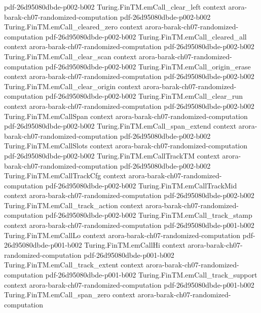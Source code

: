 \begin{theorem}
  {pdf-26d95080dbde-p002-b002}
\proofstep
  {Turing.FinTM.emCall_clear_left}
  {context}
  {arora-barak-ch07-randomized-computation}
  {pdf-26d95080dbde-p002-b002}
\proofstep
  {Turing.FinTM.emCall_cleared_zero}
  {context}
  {arora-barak-ch07-randomized-computation}
  {pdf-26d95080dbde-p002-b002}
\proofstep
  {Turing.FinTM.emCall_cleared_all}
  {context}
  {arora-barak-ch07-randomized-computation}
  {pdf-26d95080dbde-p002-b002}
\proofstep
  {Turing.FinTM.emCall_clear_scan}
  {context}
  {arora-barak-ch07-randomized-computation}
  {pdf-26d95080dbde-p002-b002}
\proofstep
  {Turing.FinTM.emCall_origin_erase}
  {context}
  {arora-barak-ch07-randomized-computation}
  {pdf-26d95080dbde-p002-b002}
\proofstep
  {Turing.FinTM.emCall_clear_origin}
  {context}
  {arora-barak-ch07-randomized-computation}
  {pdf-26d95080dbde-p002-b002}
\proofstep
  {Turing.FinTM.emCall_clear_run}
  {context}
  {arora-barak-ch07-randomized-computation}
  {pdf-26d95080dbde-p002-b002}
\proofstep
  {Turing.FinTM.emCallSpan}
  {context}
  {arora-barak-ch07-randomized-computation}
  {pdf-26d95080dbde-p002-b002}
\proofstep
  {Turing.FinTM.emCall_span_extend}
  {context}
  {arora-barak-ch07-randomized-computation}
  {pdf-26d95080dbde-p002-b002}
\proofstep
  {Turing.FinTM.emCallSlots}
  {context}
  {arora-barak-ch07-randomized-computation}
  {pdf-26d95080dbde-p002-b002}
\proofstep
  {Turing.FinTM.emCallTrackTM}
  {context}
  {arora-barak-ch07-randomized-computation}
  {pdf-26d95080dbde-p002-b002}
\proofstep
  {Turing.FinTM.emCallTrackCfg}
  {context}
  {arora-barak-ch07-randomized-computation}
  {pdf-26d95080dbde-p002-b002}
\proofstep
  {Turing.FinTM.emCallTrackMid}
  {context}
  {arora-barak-ch07-randomized-computation}
  {pdf-26d95080dbde-p002-b002}
\proofstep
  {Turing.FinTM.emCall_track_action}
  {context}
  {arora-barak-ch07-randomized-computation}
  {pdf-26d95080dbde-p002-b002}
\proofstep
  {Turing.FinTM.emCall_track_stamp}
  {context}
  {arora-barak-ch07-randomized-computation}
  {pdf-26d95080dbde-p001-b002}
\proofstep
  {Turing.FinTM.emCallLo}
  {context}
  {arora-barak-ch07-randomized-computation}
  {pdf-26d95080dbde-p001-b002}
\proofstep
  {Turing.FinTM.emCallHi}
  {context}
  {arora-barak-ch07-randomized-computation}
  {pdf-26d95080dbde-p001-b002}
\proofstep
  {Turing.FinTM.emCall_track_extent}
  {context}
  {arora-barak-ch07-randomized-computation}
  {pdf-26d95080dbde-p001-b002}
\proofstep
  {Turing.FinTM.emCall_track_support}
  {context}
  {arora-barak-ch07-randomized-computation}
  {pdf-26d95080dbde-p001-b002}
\proofstep
  {Turing.FinTM.emCall_span_zero}
  {context}
  {arora-barak-ch07-randomized-computation}

\end{theorem}
